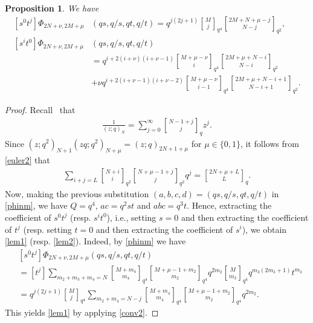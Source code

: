 \documentclass[12pt]{amsart}
\numberwithin{equation}{section}
\theoremstyle{plain}
\newtheorem{proposition}[theorem]{Proposition}
\theoremstyle{definition}
\begin{document}
\begin{proposition}\label{lem} We have 
\begin{align}\label{lem1}
[s^0t^j]\Phi_{2N+\nu, 2M+\mu}&(qs,q/s,qt,q/t)=q^{j(2j+1)}{M\brack j}_{q^4}{2M+N+\mu-j\brack N-j}_{q^2},\\
\label{lem2}
[s^it^0]\Phi_{2N+\nu, 2M+\mu}&(qs,q/s,qt,q/t)\\
&=
q^{i+2(i+\nu)(i+\nu-1)}{M+\mu-\nu\brack i}_{q^4}
{2M+\mu+N-i\brack N-i}_{q^2}\nonumber \\
&+\nu q^{i+2(i+\nu-1)(i+\nu-2)}{M+\mu-\nu\brack i-1}_{q^4}{2M+\mu+N-i+1\brack N-i+1}_{q^2}.\nonumber
\end{align}
\end{proposition}
\begin{proof} 
Recall~\cite[p. 36]{andtp} that
\begin{align}\label{euler2}
\frac{1}{(z;q)_{N}}=\sum_{j=0}^\infty {N-1+j\brack j}_q z^j.
\end{align}
Since  $(z;q^2)_{N+1} (zq;q^2)_{N+\mu}=(z;q)_{2N+1+\mu}$ for $\mu\in \{0,1\}$,  it follows from \eqref{euler2} that
\begin{align}\label{conv2}
\sum_{i+j=L}{N+i\brack i}_{q^2}   {N+\mu-1+j\brack j}_{q^2}q^j= {2N+\mu+L\brack L}_{q}.
\end{align}
Now, making the previous  substitution  $(a,b,c,d)=(qs,q/s,qt,q/t)$ in \eqref{phinm}, 
we have $Q=q^4$, $ac=q^2st$ and $abc=q^3t$. Hence, extracting the coefficient of $s^0t^j$ (resp. $s^it^0$), i.e., 
setting $s=0$ and then extracting the coefficient of $t^j$ (resp. setting $t=0$ and then extracting the coefficient of $s^i$), 
 we obtain \eqref{lem1} (resp. \eqref{lem2}). Indeed, by  \eqref{phinm} we have 
 \begin{align*}
 &[s^0t^j]\Phi_{2N+\nu, 2M+\mu}(qs,q/s,qt,q/t)\\
 &=[t^j]\sum_{m_2+m_3+m_4=N} {M+m_4\brack m_4}_{q^4}
 {M+\mu-1+m_2\brack m_2}_{q^4} q^{2m_2}{M\brack m_3}_{q^4}q^{m_3(2m_3+1)} t^{m_3}\\
 &=q^{j(2j+1)}{M\brack j}_{q^4}\sum_{m_2+m_4=N-j} {M+m_4\brack m_4}_{q^4}
 {M+\mu-1+m_2\brack m_2}_{q^4} q^{2m_2}.
 \end{align*}
 This yields \eqref{lem1} by applying \eqref{conv2}.
\end{proof}
\end{document}
